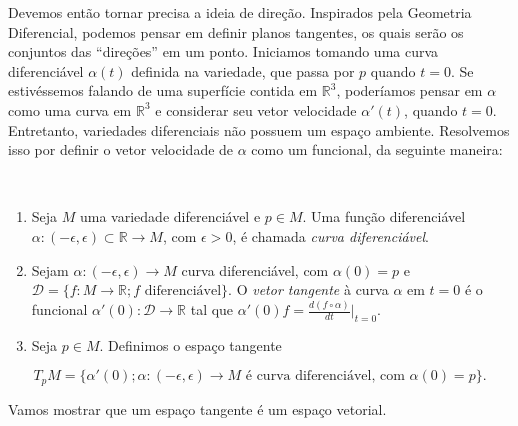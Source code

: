 	Devemos então tornar precisa a ideia de direção.
	Inspirados pela Geometria Diferencial, podemos pensar em definir planos tangentes, os quais serão os conjuntos das ``direções'' em um ponto. Iniciamos tomando uma curva diferenciável $\alpha(t)$ definida na variedade, que passa por $p$ quando $t=0$. Se estivéssemos falando de uma superfície contida em $\mathbb{R}^{3}$, poderíamos pensar em $\alpha$ como uma curva em $\mathbb{R}^{3}$ e considerar seu vetor velocidade $\alpha'(t)$, quando $t=0$. Entretanto, variedades diferenciais não possuem um espaço ambiente. Resolvemos isso por definir o vetor velocidade de $\alpha$ como um funcional, da seguinte maneira:
	\begin{definition}
		\label{def:espaco-tangente}
		$ $
		\begin{enumerate}[label=(\roman*)]
			\item Seja $M$ uma variedade diferenciável e $p \in M$. Uma função diferenciável $\alpha:(-\epsilon, \epsilon) \subset \mathbb{R} \to M$, com $\epsilon>0$, é chamada \emph{curva diferenciável}.
			\item Sejam $\alpha:(-\epsilon, \epsilon)\to M$ curva diferenciável, com $\alpha(0)=p$ e $\mathcal{D}=\{ f:M\to \mathbb{R}; f \text{ diferenciável} \}$. O \emph{vetor tangente} à curva $\alpha$ em $t=0$ é o funcional $\alpha'(0):\mathcal{D}\to \mathbb{R}$ tal que $\alpha'(0)f=\frac{d(f\circ\alpha)}{dt}|_{t=0}$.
			\item Seja $p \in M$. Definimos o espaço tangente
		\end{enumerate}
		\begin{equation*}
			T_{p}M=\{ \alpha'(0); \alpha:(-\epsilon, \epsilon)\to M \text{ é curva diferenciável, com } \alpha(0)=p \}.
		\end{equation*}
	\end{definition}
	Vamos mostrar que um espaço tangente é um espaço vetorial.
